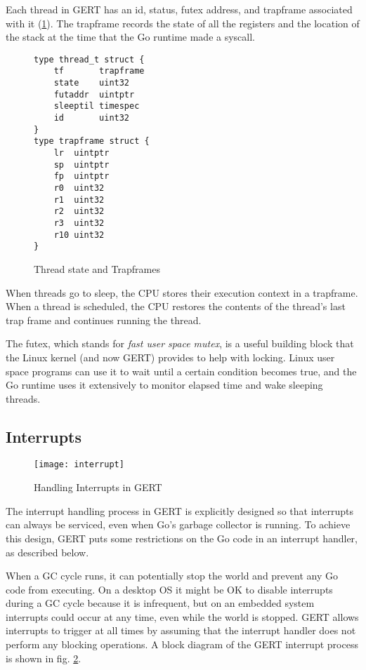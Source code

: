 Each thread in GERT has an id, status, futex address, and trapframe associated with it (\ref{fig:threadtrap}).
The trapframe records the state of all the registers and the location of the stack at
the time that the Go runtime made a syscall.

\begin{figure}[h]
  \begin{lstlisting}
type thread_t struct {
	tf       trapframe
	state    uint32
	futaddr  uintptr
	sleeptil timespec
	id       uint32
}
type trapframe struct {
	lr  uintptr
	sp  uintptr
	fp  uintptr
	r0  uint32
	r1  uint32
	r2  uint32
	r3  uint32
	r10 uint32
}
\end{lstlisting}

  \caption{Thread state and Trapframes} \label{fig:threadtrap}
\end{figure}

When threads go to sleep, the CPU stores their execution context in a trapframe.
When a thread is scheduled, the CPU restores the contents of the thread's last trap
frame and continues running the thread.

The futex, which stands for \textit{fast user space mutex}, is a useful building block
that the Linux kernel (and now GERT) provides to help with locking. Linux user space programs can use
it to wait until a certain condition becomes true, and the Go runtime uses it extensively
to monitor elapsed time and wake sleeping threads.


\subsection{Interrupts}
\begin{figure}[h]
\begin{center}
  \texttt{[image: interrupt]}
\end{center}
  \caption{Handling Interrupts in GERT} \label{fig:interrupt}
\end{figure}

The interrupt handling process in GERT is explicitly designed so
that interrupts can always be serviced, even when Go's garbage collector
is running. To achieve this design, GERT puts some restrictions on the Go code
in an interrupt handler, as described below.

When a GC cycle runs, it can potentially stop the world and
prevent any Go code from executing. On a desktop OS it might be OK to disable
interrupts during a GC cycle because it is infrequent, but on an embedded system
interrupts could occur at any time, even while the world is
stopped. GERT allows interrupts to trigger at all times by assuming that the
interrupt handler does not perform any blocking operations. A block diagram
of the GERT interrupt process is shown in fig. \ref{fig:interrupt}.

